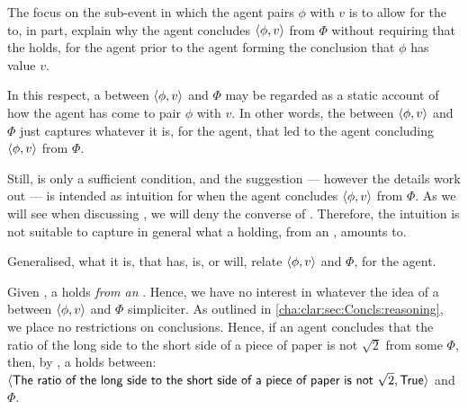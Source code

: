 \begin{note}
  The focus on the sub-event in which the agent pairs \(\phi\) with \(v\) is to allow for the \ros{} to, in part, explain why the agent concludes \(\langle \phi, v \rangle\) from \(\Phi\) without requiring that the \ros{} holds, for the agent prior to the agent forming the conclusion that \(\phi\) has value \(v\).

  In this respect, a \ros{} between \(\langle \phi, v \rangle\) and \(\Phi\) may be regarded as a static account of how the agent has come to pair \(\phi\) with \(v\).
  In other words, the \ros{} between \(\langle \phi, v \rangle\) and \(\Phi\) just captures whatever it is, for the agent, that led to the agent concluding \(\langle \phi, v \rangle\) from \(\Phi\).

  Still, \supportI{} is only a sufficient condition, and the suggestion --- however the details work out --- is intended as intuition for when the agent concludes \(\langle \phi, v \rangle\) from \(\Phi\).
  As we will see when discussing \supportII{}, we will deny the converse of \supportI{}.
  Therefore, the intuition is not suitable to capture in general what a \ros{} holding, from an \agpe{}, amounts to.

  Generalised, what it is, that has, is, or will, relate \(\langle \phi, v \rangle\) and \(\Phi\), for the agent.
\end{note}

\begin{note}
  Given \supportI{}, a \ros{} holds \emph{from an \agpe{}}.
  Hence, we have no interest in whatever the idea of a \ros{} between \(\langle \phi, v \rangle\) and \(\Phi\) simpliciter.
  As outlined in \autoref{cha:clar:sec:Concls:reasoning}, we place no restrictions on conclusions.
  Hence, if an agent concludes that the ratio of the long side to the short side of a piece of paper is not \(\sqrt{2}\) from some \pool{} \(\Phi\), then, by \supportI{}, a \ros{} holds between:
  \(\pv{\propI{The ratio of the long side to the short side of a piece of paper is not }\sqrt{2}}{\valI{True}}\) and \(\Phi\).
\end{note}

